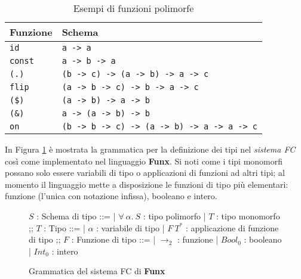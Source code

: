 \begin{table}[H]
    \vspace{4mm}
    \begin{center}
        \renewcommand{\arraystretch}{1.3}
        \begin{tabularx}{\textwidth}{|p{5em}|X|}
            \hline
            \textbf{Funzione} & \textbf{Schema}                                   \\
            \hline
            \texttt{id}       & \texttt{a -> a}                                   \\
            \hline
            \texttt{const}    & \texttt{a -> b -> a}                              \\
            \hline
            \texttt{(.)}      & \texttt{(b -> c) -> (a -> b) -> a -> c}           \\
            \hline
            \texttt{flip}     & \texttt{(a -> b -> c) -> b -> a -> c}             \\
            \hline
            \texttt{(\$)}     & \texttt{(a -> b) -> a -> b}                       \\
            \hline
            \texttt{(\&)}     & \texttt{a -> (a -> b) -> b}                       \\
            \hline
            \texttt{on}       & \texttt{(b -> b -> c) -> (a -> b) -> a -> a -> c} \\
            \hline
        \end{tabularx}
    \end{center}
    \caption{Esempi di funzioni polimorfe}
    \label{tab:3-polymorphic-functions}
    \vspace{4mm}
\end{table}

\noindent In Figura \ref{fig:3-system-fc} è mostrata la grammatica per la definizione dei tipi nel \textit{sistema FC}
così come implementato nel linguaggio \textbf{Funx}. Si noti come i tipi monomorfi possano solo essere
variabili di tipo o applicazioni di funzioni ad altri tipi; al momento il linguaggio mette a disposizione
le funzioni di tipo più elementari: funzione (l'unica con notazione infissa), booleano e intero.

\begin{figure}[H]
    \centering
    \vspace{4mm}
    \begin{spacedbnf}
        $S$ : \small{Schema di tipo} ::=
        | $\forall\ \alpha\mathord{.}\ S$ : \small{tipo polimorfo}
        | $T$ : \small{tipo monomorfo}
        ;;
        $T$ : \small{Tipo} ::=
        | $\alpha$ : \small{variabile di tipo}
        | $F\ T^*$ : \small{applicazione di funzione di tipo}
        ;;
        $F$ : \small{Funzione di tipo} ::=
        | $\rightarrow_2$ : \small{funzione}
        | $Bool_0$ : \small{booleano}
        | $Int_0$ : \small{intero}
    \end{spacedbnf}
    \caption{Grammatica del sistema FC di \textbf{Funx}}
    \label{fig:3-system-fc}
    \vspace{4mm}
\end{figure}